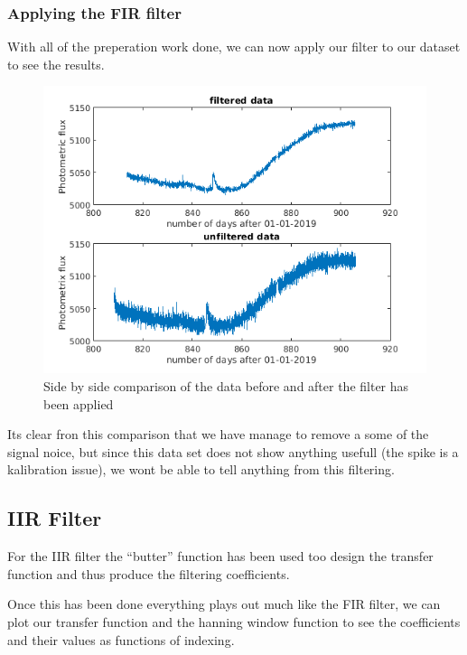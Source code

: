 \subsubsection{Applying the FIR filter}
With all of the preperation work done, we can now apply our filter to our dataset to see the results.

\begin{figure}[h]
  \centering
  \includegraphics[scale=0.62]{matlabStuff/datasetComparison.png}
  \caption{Side by side comparison of the data before and after the filter has been applied}%
  \label{fig:datasetComparison}
\end{figure}

Its clear fron this comparison that we have manage to remove a some of the signal noice, but since this data set does not show
anything usefull (the spike is a kalibration issue), we wont be able to tell anything from this filtering.

\newpage

\subsection{IIR Filter}

For the IIR filter the ``butter'' function has been used
too design the transfer function and thus produce the 
filtering coefficients.

Once this has been done everything plays out much like the 
FIR filter, we can plot our transfer function and the 
hanning window function to see the coefficients
and their values as functions of indexing.

